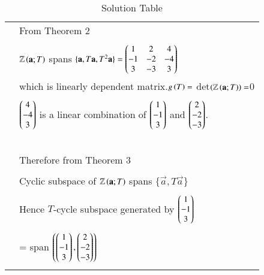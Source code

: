 \documentclass[journal,12pt]{IEEEtran}
\begin{document}
\begin{longtable}{|l|l|}
&From Theorem 2\\
&\\
&$\mathbb{Z}\left(\mathbf{a};T\right)$ spans $\{\mathbf{a},T\mathbf{a},T^2\mathbf{a}\}=\begin{pmatrix}1&2&4\\-1&-2&-4\\3&-3&3\end{pmatrix}$\\
&which is linearly dependent matrix.$g\left(T\right)=$ det$\left(\mathbb{Z}\left(\mathbf{a};T\right)\right)=$0\\
&\\
&$\begin{pmatrix}4\\-4\\3\end{pmatrix}$ is a linear combination of $\begin{pmatrix}1\\-1\\3\end{pmatrix}$ and $\begin{pmatrix}2\\-2\\-3\end{pmatrix}$.\\
&\\
&\\

&\\
&\\
\hline
&\\
& Therefore from Theorem 3\\
&\\
&Cyclic subspace of $\mathbb{Z}\left(\mathbf{a};T\right)$ spans $\{\vec{a} , T\vec{a}\}$\\
&\\
&Hence $T$-cycle subspace generated by $\begin{pmatrix}1\\-1\\3\end{pmatrix}$\\
&\\
&= span $\left(\begin{pmatrix}1\\-1\\3\end{pmatrix},\begin{pmatrix}2\\-2\\-3\end{pmatrix}\right)$ \\

\hline

\caption{Solution Table}
\label{table:2}
\end{longtable}
\end{document}
